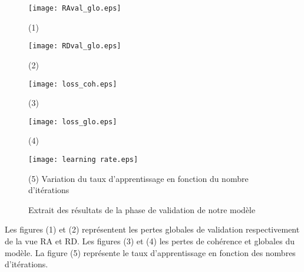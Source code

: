\newpage
\begin{figure}[hbt!]
  \centering
  \begin{minipage}{0.45\linewidth}
    \centering
    \texttt{[image: RAval\_glo.eps]}
    \caption{(1)}
  \end{minipage}
  \begin{minipage}{0.45\linewidth}
    \texttt{[image: RDval\_glo.eps]}   
   \caption{(2)}
  \end{minipage}
  \hfill
  \begin{minipage}{0.45\linewidth}
    \centering
    \texttt{[image: loss\_coh.eps]}
    \caption{(3)}
  \end{minipage}
  \begin{minipage}{0.45\linewidth}

    \texttt{[image: loss\_glo.eps]}
    \caption{(4)}
  \end{minipage}
  \begin{minipage}{\linewidth}
    \centering
    \texttt{[image: learning rate.eps]}
    \caption{(5) Variation du taux d'apprentissage en fonction du nombre d'itérations}
    \label{fig:427}
  \end{minipage}
  \caption{Extrait des résultats de la phase de validation de notre modèle}
  \label{fig:428}
\end{figure}
Les figures (1) et (2) représentent les pertes globales de validation respectivement de la vue RA et RD. Les figures (3) et (4) les pertes de cohérence et globales du modèle. La figure (5) représente le taux d'apprentissage en fonction des nombres d'itérations.

